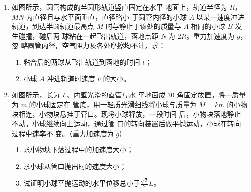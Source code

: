 \begin{enumerate}
{}


\newpage
\item 
{}
如图所示，圆管构成的半圆形轨道竖直固定在水平
地面上，轨道半径为 $ R $，$ MN $ 为直径且与水平面垂直，直径略小
于圆管内径的小球 $ A $ 以某一速度冲进轨道，到达半圆轨道最高点
$ M $ 时与静止于该处的质量与 $ A $ 相同的小球 $ B $ 发生碰撞，碰后两
球粘在一起飞出轨道，落地点距 $ N $ 为 $ 2R $。重力加速度为 $ g $，忽
略圆管内径，空气阻力及各处摩擦均不计，求：
\begin{enumerate}
\renewcommand{\labelenumi}{\arabic{enumi}.}
\item
粘合后的两球从飞出轨道到落地的时间 $ t $；
\item 
小球 $ A $ 冲进轨道时速度 $ v $ 的大小。




\end{enumerate}
\begin{figure}[h!]
\flushright

\end{figure}




\newpage
\item 
{}
如图所示，长为 $ L $、内壁光滑的直管与水
平地面成 $ 30 ^{ \circ } $角固定放置。将一质量为 $ m $ 的小球固定在
管底，用一轻质光滑细线将小球与质量为 $ M=km $ 的小物
块相连，小物块悬挂于管口。现将小球释放，一段时间
后，小物块落地静止不动，小球继续向上运动，通过管
口的转向装置后做平抛运动，小球在转向过程中速率不
变。（重力加速度为 $ g $）
\begin{enumerate}
\renewcommand{\labelenumi}{\arabic{enumi}.}
\item
求小物块下落过程中的加速度大小；
\item 
求小球从管口抛出时的速度大小；
\item 
试证明小球平抛运动的水平位移总小于$\frac{\sqrt{2}}{2} L$。





\end{enumerate}
\end{enumerate}
